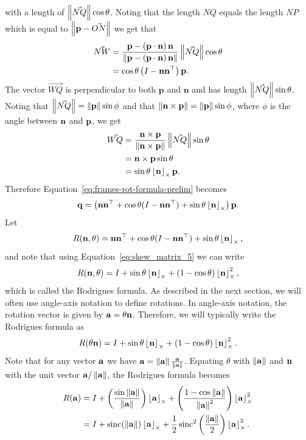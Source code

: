 with a length of $\left\|\vec{NQ}\right\|\cos\theta$.  Noting that the length $NQ$ equals
the length $NP$ which is equal to $\left\|\mathbf{p}-\vec{ON}\right\|$ we
get that
\begin{align*}
\vec{NW} &= \frac{\mathbf{p}-\left(\mathbf{p} \cdot \mathbf{n}\right)\mathbf{n}}
{\left\|\mathbf{p}-\left(\mathbf{p}\cdot\mathbf{n}\right)\mathbf{n}\right\|}
\left\|\vec{NQ}\right\|\cos\theta
\\
&=
\cos\theta\left(I-\mathbf{n}\mathbf{n}^\top\right)\mathbf{p}.
\end{align*}
The vector $\vec{WQ}$ is perpendicular to both $\mathbf{p}$ and
$\mathbf{n}$ and has length $\left\|\vec{NQ}\right\|\sin\theta$.  Noting that
$\left\|\vec{NQ}\right\|=\left\|\mathbf{p}\right\|\sin\phi$ and that $\left\|\mathbf{n}\times\mathbf{p}\right\|=\left\|\mathbf{p}\right\|\sin\phi$, where $\phi$ is the angle between $\mathbf{n}$ and $\mathbf{p}$, we get
\begin{align*}
\vec{WQ} &=
\frac{\mathbf{n}\times\mathbf{p}}{\left\|\mathbf{n}\times\mathbf{p}\right\|}\left\|\vec{NQ}\right\|\sin\theta
\\
&= \mathbf{n}\times\mathbf{p}\sin\theta \\
&= \sin\theta \left\lfloor\mathbf{n}\right\rfloor_{\times}\mathbf{p}.
\end{align*}
Therefore Equation~\eqref{eq:frames-rot-formula-prelim} becomes
\[
\mathbf{q} = \left(\mathbf{n} \mathbf{n}^\top + \cos\theta (I-\mathbf{n}\mathbf{n}^\top) + \sin\theta \left\lfloor\mathbf{n}\right\rfloor_{\times} \right)\mathbf{p}.
\]
Let
\[
R(\mathbf{n},\theta)=\mathbf{n} \mathbf{n}^\top + \cos\theta (I-\mathbf{n}\mathbf{n}^\top) + \sin\theta \left\lfloor\mathbf{n}\right\rfloor_{\times},
\]
and note that using Equation~\eqref{eq:skew_matrix_5} we can write
\begin{equation}\label{eq:rodrigues_1}
R(\nbf,\theta)=I + \sin\theta \ss{\nbf} + (1-\cos\theta)\ss{\nbf}^2,
\end{equation}
which is called the Rodrigues formula.
As described in the next section, we will often use angle-axis notation to define rotations.  In angle-axis notation, the rotation vector is given by
$\mathbf{a}=\theta\mathbf{n}$.  Therefore, we will typically write the Rodrigues formula as 
\begin{equation}\label{eq:rodigues_2}
	R(\theta\nbf) = I + \sin\theta \ss{\nbf} + (1-\cos\theta)\ss{\nbf}^2.
\end{equation}
Note that for any vector $\mathbf{a}$ we have $\mathbf{a}=\left\|\mathbf{a}\right\|\frac{\mathbf{a}}{\left\|\mathbf{a}\right\|}$.  Equating $\theta$ with $\left\|\mathbf{a}\right\|$ and $\mathbf{n}$ with the unit vector $\mathbf{a}/\left\|\mathbf{a}\right\|$, the Rodrigues formula becomes
\begin{align}
R(\abf) &= I + \left(\frac{\sin\norm{\abf}}{\norm{\abf}}\right)\ss{\abf} + \left(\frac{1-\cos\norm{\abf}}{\norm{\abf}^2}\right)\ss{\abf}^2 \notag \\
		&= I + \sinc(\norm{\abf})\ss{\abf} + \frac{1}{2}\sinc^2\left(\frac{\norm{\abf}}{2}\right)\ss{\abf}^2.
		\label{eq:rodrigues_2}
\end{align}

